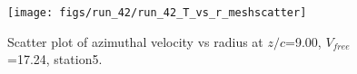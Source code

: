 \begin{figure}[H]
\centering
\texttt{[image: figs/run\_42/run\_42\_T\_vs\_r\_meshscatter]}
\caption{Scatter plot of azimuthal velocity vs radius at $z/c$=9.00, $V_{free}$=17.24, station5.}
\label{fig:run_42_T_vs_r_meshscatter}
\end{figure}


